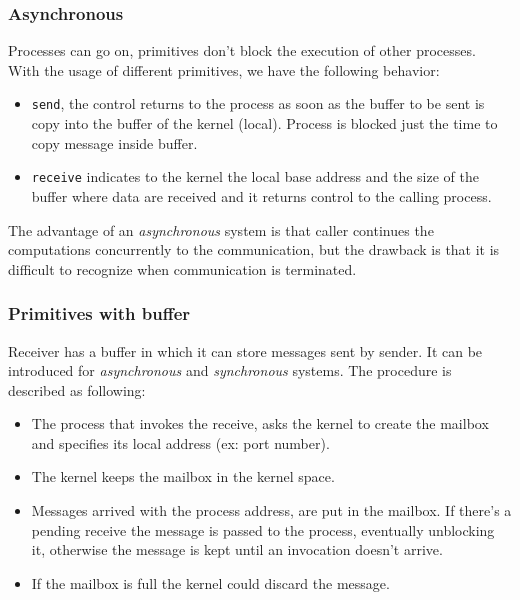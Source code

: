 \documentclass[11pt,a4paper]{article}
\begin{document}
\subsubsection{Asynchronous}
Processes can go on, primitives don't block the execution of other processes. With the usage of different primitives, we have the following behavior:  
\begin{itemize}
	\item \verb!send!, the control returns to the process as soon as the buffer to be sent is copy into the buffer of the kernel (local). Process is blocked just the time to copy message inside buffer. 
	\item \verb!receive! indicates to the kernel the local base address and the size of the buffer where data are received and it returns control to the calling process.
\end{itemize}
The advantage of an \textit{asynchronous} system is that caller continues the computations concurrently to the communication, but the drawback is that it is difficult to recognize when communication is terminated.
\subsubsection{Primitives with buffer}
Receiver has a buffer in which it can store messages sent by sender. It can be introduced for \textit{asynchronous} and \textit{synchronous} systems. The procedure is described as following:
\begin{itemize}
	\item The process that invokes the receive, asks the kernel to create the mailbox and specifies its local address (ex: port number).
	\item The kernel keeps the mailbox in the kernel space.
	\item Messages arrived with the process address, are put in the mailbox. If there's a pending receive the message is passed to the process, eventually unblocking it, otherwise the message is kept until an invocation doesn't arrive.
	\item If the mailbox is full the kernel could discard the message. 
\end{itemize}
\end{document}
